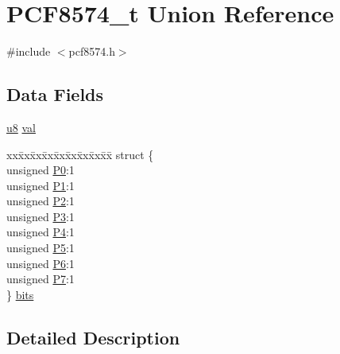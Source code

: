 \hypertarget{union_p_c_f8574__t}{\section{P\-C\-F8574\-\_\-t Union Reference}
\label{union_p_c_f8574__t}
}


{\ttfamily \#include $<$pcf8574.\-h$>$}

\subsection*{Data Fields}
\begin{DoxyCompactItemize}
\item 
\hyperlink{p8_2pinguino_2core_2typedef_8h_aed742c436da53c1080638ce6ef7d13de}{u8} \hyperlink{union_p_c_f8574__t_a5d0cde7a426451812b691b5ae4a01560}{val}
\item 
\begin{tabbing}
xx\=xx\=xx\=xx\=xx\=xx\=xx\=xx\=xx\=\kill
struct \{\\
\>unsigned \hyperlink{union_p_c_f8574__t_a9e4cb49a5e93d50ae3a30b7c6488aa6b}{P0}:1\\
\>unsigned \hyperlink{union_p_c_f8574__t_a906a662bcac1c1443ea857761f41500e}{P1}:1\\
\>unsigned \hyperlink{union_p_c_f8574__t_a4a03007ff6fe61dc33f5e37e0390fe97}{P2}:1\\
\>unsigned \hyperlink{union_p_c_f8574__t_ac74f90ee94cbedbce61fae5a3c272269}{P3}:1\\
\>unsigned \hyperlink{union_p_c_f8574__t_a09320e8d5a61c57aa3557d0d5f307944}{P4}:1\\
\>unsigned \hyperlink{union_p_c_f8574__t_ad6df7c6a81cde10e7e95738e30e099e9}{P5}:1\\
\>unsigned \hyperlink{union_p_c_f8574__t_a058a2e3f96a00e0849823e77872d8fcb}{P6}:1\\
\>unsigned \hyperlink{union_p_c_f8574__t_af18908c2fbc85cadea0f256b17c63845}{P7}:1\\
\} \hyperlink{union_p_c_f8574__t_a5f733cca3c2a08f19abf904562e56b7d}{bits}\\

\end{tabbing}\end{DoxyCompactItemize}


\subsection{Detailed Description}


